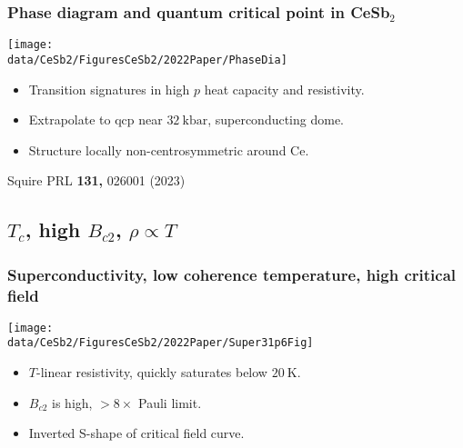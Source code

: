 \begin{frame}[label=PhaseDia]
\frametitle{Phase diagram and quantum critical point in CeSb$_2$}

\centerline{\texttt{[image: \\data/CeSb2/FiguresCeSb2/2022Paper/PhaseDia]}}

\begin{itemize}
\item Transition signatures in high $p$ heat capacity and resistivity.
\item Extrapolate to qcp near $\SI{32}{\kilo\bar}$, superconducting dome.
\item Structure locally non-centrosymmetric around Ce.

\end{itemize}

\vfill
\centerline{\makebox[\linewidth]{\rule{0.85\textwidth}{0.4pt}}}

\centerline{\scriptsize Squire PRL {\bf 131,} 026001 (2023)}

\end{frame}


\subsection{$T_c$, high $B_{c2}$, $\rho \propto T$}

\begin{frame}[label=KeyResult]
\frametitle{Superconductivity, low coherence temperature, high critical field }

\centerline{\texttt{[image: \\data/CeSb2/FiguresCeSb2/2022Paper/Super31p6Fig]}}
\begin{itemize}
\item $T$-linear resistivity, quickly saturates below $\SI{20}{\kelvin}$.
\item $B_{c2}$ is high, $>8\times$ Pauli limit.
\item Inverted S-shape of critical field curve.
\end{itemize}
\end{frame}


